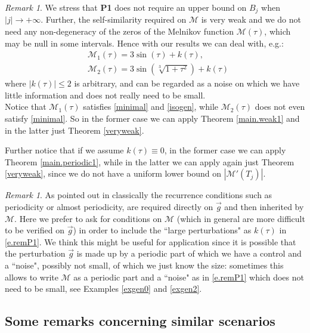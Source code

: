 \documentclass[10pt]{article}
\numberwithin{equation}{section}
\def\MM{{\mathcal M}}
\def\g{\vec{g}}
\newcommand\assump[1]{{\rm\textbf{#1}}}
\theoremstyle{definition}
\theoremstyle{remark}
\newtheorem{remark}[theorem]{Remark}
\begin{document}
\begin{remark}\label{remP1}
We stress that \assump{P1} does not require an upper bound on $B_j$ when $|j| \to +\infty$.
Further, the self-similarity required on $\MM$ is very weak and we do not need any non-degeneracy of the zeros of the Melnikov function
$\MM(\tau)$, which may be null in some intervals. Hence with our results we can deal with, e.g.:
\begin{equation}\label{e.remP1}
\begin{split}
&     \MM_1(\tau)= 3\sin ( \tau)+ k(\tau), \\
    & \MM_2(\tau)= 3\sin (\sqrt[3]{1+\tau^2})+ k(\tau)
\end{split}
\end{equation}
where $|k(\tau)| \le 2$ is arbitrary, and can be regarded as a noise on which we have little information
and does not really need to be small.
\\
Notice that $\MM_1(\tau)$  satisfies \eqref{minimal} and \eqref{isogen},
  while
$\MM_2(\tau)$ does not even satisfy
\eqref{minimal}. So in the former case
we can apply Theorem \ref{main.weak1} and in the latter just Theorem \ref{veryweak}.

Further notice that if we assume $k(\tau) \equiv 0$, in the former case we can apply Theorem \ref{main.periodic1}, while in the latter we can apply again just Theorem \ref{veryweak}, since we do not have a
uniform lower bound on     $|\MM'(T_j)|$.
\end{remark}
\begin{remark}\label{toaddinPrestate}
  As pointed out in \cite{CFPrestate} classically the recurrence conditions such as periodicity or almost periodicity, are required directly on $\g$ and
  then inherited by $\MM$. Here we prefer to ask for conditions on $\MM$ (which in general are more difficult to be verified on $\g$)
  in order to include the ``large perturbations" as $k(\tau)$ in \eqref{e.remP1}. We think this might be useful for application since
  it is possible that the perturbation $\g$ is made up by a periodic part of which we have a control and a ``noise", possibly not small, of which
  we just know the size: sometimes this allows to write  $\MM$ as a periodic part and a ``noise" as in \eqref{e.remP1} which does not need to be small, see   Examples \ref{exgen0} and \ref{exgen2}.
\end{remark}


\subsection{Some remarks concerning similar scenarios} \label{S.scenarios}
\end{document}
